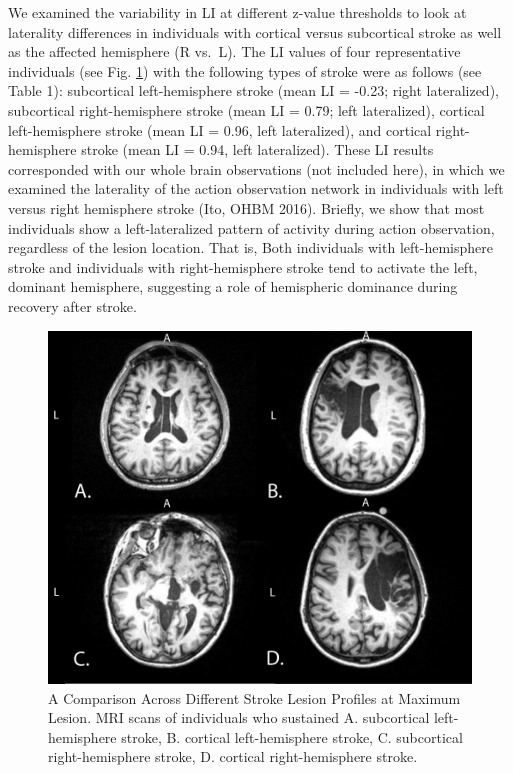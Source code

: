 \documentclass[twocolumn]{bmcart}%
\begin{document}
We examined the variability in LI at different z-value thresholds to
look at laterality differences in individuals with cortical versus
subcortical stroke as well as the affected hemisphere (R vs.~L). The LI
values of four representative individuals (see Fig. \ref{fig1}) with the
following types of stroke were as follows (see Table 1): subcortical
left-hemisphere stroke (mean LI = -0.23; right lateralized), subcortical
right-hemisphere stroke (mean LI = 0.79; left lateralized), cortical
left-hemisphere stroke (mean LI = 0.96, left lateralized), and cortical
right-hemisphere stroke (mean LI = 0.94, left lateralized). These LI
results corresponded with our whole brain observations (not included
here), in which we examined the laterality of the action observation
network in individuals with left versus right hemisphere stroke (Ito,
OHBM 2016). Briefly, we show that most individuals show a
left-lateralized pattern of activity during action observation,
regardless of the lesion location. That is, Both individuals with
left-hemisphere stroke and individuals with right-hemisphere stroke tend
to activate the left, dominant hemisphere, suggesting a role of
hemispheric dominance during recovery after stroke.

\begin{figure}[h!]
  \includegraphics[width=.47\textwidth]{desmxz.jpg}
  \caption{\label{fig1}
  A Comparison Across Different Stroke Lesion Profiles at Maximum Lesion. MRI scans of individuals who sustained A. subcortical left-hemisphere stroke, B. cortical left-hemisphere stroke, C. subcortical right-hemisphere stroke, D. cortical right-hemisphere stroke. }
\end{figure}
\end{document}
